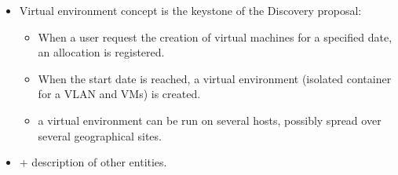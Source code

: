 \begin{itemize}
	\item Virtual environment concept is the keystone of the Discovery proposal:
		
		\begin{itemize}

			\item When a user request the creation of virtual machines for a specified date, an allocation is registered.

			\item When the start date is reached, a virtual environment (isolated container for a VLAN and VMs) is created.

			\item a virtual environment can be run on several hosts, possibly spread over several geographical sites.

		\end{itemize}

	\item + description of other entities.

\end{itemize}